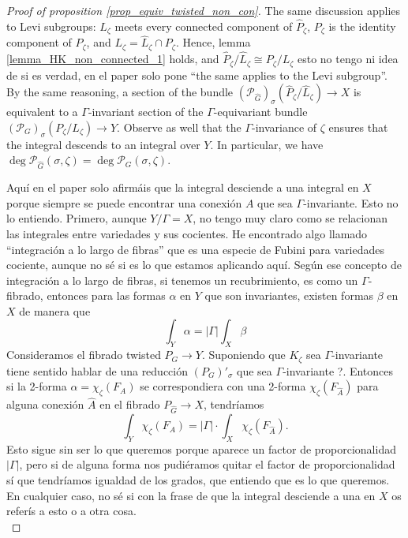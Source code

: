 {\begin{proof}[\textit{Proof of proposition} \ref{prop_equiv_twisted_non_con}]
    The same discussion applies to Levi subgroups: \(\hat{L}_\zeta\) meets every connected component of \(\hat{P}_\zeta\), \(P_\zeta\) is the identity component of \(\hat{P}_\zeta\), and \(L_\zeta =\hat{L}_\zeta \cap P_\zeta\). Hence, lemma \ref{lemma_HK_non_connected_1} holds, and \(\hat{P}_\zeta /\hat{L}_\zeta\cong P_\zeta/L_\zeta\) {\color{red} esto no tengo ni idea de si es verdad, en el paper solo pone ``the same applies to the Levi subgroup''}. By the same reasoning, a section of the bundle \((\mathcal{P}_{\hat{G}})_\sigma(\hat{P}_\zeta / \hat{L}_\zeta)\to X\) is equivalent to a \(\Gamma\)-invariant section of the \(\Gamma\)-equivariant bundle \((\mathcal{P}_G)_\sigma(P_\zeta/L_\zeta)\to Y\). Observe as well that the \(\Gamma\)-invariance of \(\zeta\) ensures that the integral descends to an integral over \(Y\). In particular, we have \(\deg \mathcal{P}_{\hat{G}}(\sigma, \zeta)=\deg \mathcal{P}_G(\sigma, \zeta)\).
    
    {\color{red}Aquí en el paper solo afirmáis que la integral desciende a una integral en \(X\) porque siempre se puede encontrar una conexión \(A\) que sea \(\Gamma\)-invariante. Esto no lo entiendo. Primero, aunque \(Y/\Gamma=X\), no tengo muy claro como se relacionan las integrales entre variedades y sus cocientes. He encontrado algo llamado ``integración a lo largo de fibras'' que es una especie de Fubini para variedades cociente, aunque no sé si es lo que estamos aplicando aquí. Según ese concepto de integración a lo largo de fibras, si tenemos un recubrimiento, es como un \(\Gamma\)-fibrado, entonces para las formas \(\alpha\) en \(Y\) que son invariantes, existen formas \(\beta\) en \(X\) de manera que 
    \[
    \int_Y \alpha = |\Gamma|\int_X \beta
    \]    
    Consideramos el fibrado twisted \(P_G \to Y\). Suponiendo que \(K_\zeta\) sea \(\Gamma\)-invariante tiene sentido hablar de una reducción \((P_G)'_\sigma\) que sea \(\Gamma\)-invariante ?. Entonces si la 2-forma \(\alpha=\chi_\zeta(F_A)\) se correspondiera con una 2-forma \(\chi_\zeta(F_{\hat{A}})\) para alguna conexión \(\hat{A}\) en el fibrado \(P_{\hat{G}}\to X\), tendríamos 
    \[
    \int_Y \chi_\zeta(F_{A})=|\Gamma|\cdot \int_X \chi_\zeta(F_{\hat{A}}).
    \]
    Esto sigue sin ser lo que queremos porque aparece un factor de proporcionalidad \(|\Gamma|\), pero si de alguna forma nos pudiéramos quitar el factor de proporcionalidad sí que tendríamos igualdad de los grados, que entiendo que es lo que queremos. En cualquier caso, no sé si con la frase de que la integral desciende a una en \(X\) os referís a esto o a otra cosa.
    } \\


\end{proof}}
